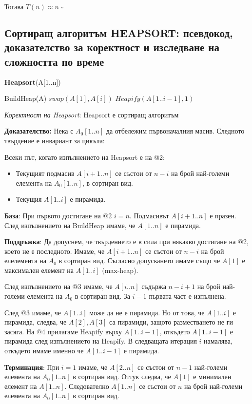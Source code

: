 \documentclass{article}
\renewcommand{\\}{\newline}
\newcommand{\doc}{\textbf{Доказателство: }}
\newcommand{\proven}{\hfill $\square$}
\begin{document}
Тогава \(T(n) \approx n\) \proven 

\subsection{Сортиращ алгоритъм HEAPSORT: псевдокод, доказателство за коректност и изследване на сложността по време}

\textbf{Heapsort}(A[1..n])
\begin{algorithmic}[1]
  \State BuildHeap(A)
    \State \(swap(A[1], A[i])\)  
    \State \(Heapify(A[1..i-1], 1)\)  
  \EndFor
\end{algorithmic}

\textit{Коректност на Heapsort}: Heapsort е сортиращ алгоритъм

\doc Нека с \(A_{0}[1..n]\) да отбележим първоначалния масив. Следното твърдение е инвариант за цикъла: 

Всеки път, когато изпълнението на Heapsort  е на @2:
\begin{itemize}
  \item Текущият подмасив \(A[i+1..n]\) се състои от \(n-i\) на брой най-големи елементa на \(A_{0}[1..n]\), в сортиран вид.
  \item Текущия \(A[1..i]\) е пирамида. 
\end{itemize}

\textbf{База}: При първото достигане на @2 \(i = n\). Подмасивът \(A[i+1..n]\) е празен. След изпълнението на BuildHeap имаме, че \(A[1..n]\) е пирамида.

\textbf{Поддръжка}: Да допуснем, че твърдението е в сила при някакво достигане на @2, което не е последното. Имаме, че \(A[i+1..n]\) се състои от \(n-i\) на брой елелемента на \(A_{0}\) в сортиран вид. Съгласно допускането имаме също че \(A[1]\) е максимален елемент на \(A[1..i]\) (max-heap). 

След изпълнението на @3 имаме, че \(A[i..n]\) съдържа \(n-i+1\) на брой най-големи елемента на \(A_{0}\) в сортиран вид. За \(i-1\) първата част е изпълнена.

След @3 имаме, че \(A[1..i]\) може да не е пирамида. Но от това, че \(A[1..i]\) е пирамида, следва, че \(A[2], A[3]\) са пирамиди, защото разместването не ги засяга. На @4 прилагаме Heapify върху \(A[1..i-1]\), откъдето \(A[1..i-1]\) е пирамида след изпълнението на Heapify. В следващата итерация \(i\) намалява, откъдето имаме именно че \(A[1..i-1]\) е пирамида.     

\textbf{Терминация}: При \(i=1\) имаме, че \(A[2..n]\) се състои от \(n-1\) най-големи елемента на \(A_{0}[1..n]\) в сортиран вид. Оттук следва, че \(A[1]\) е минимален елемент на \(A[1..n]\). Следователно \(A[1..n]\) се състои от \(n\) на брой най-големи елемента на \(A_{0}[1..n]\) в сортиран вид.         
\end{document}
